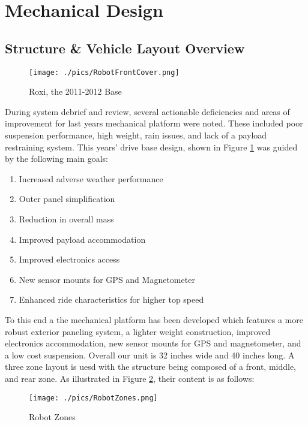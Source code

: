 \section{Mechanical Design}

\subsection{Structure \& Vehicle Layout Overview}

\begin{figure}[H]
\begin{center}
\texttt{[image: ./pics/RobotFrontCover.png]}
\caption{Roxi, the 2011-2012 Base}
\label{FIG:Roxi}
\end{center}
\end{figure}


 During system debrief and review, several actionable deficiencies and areas of improvement for last years mechanical platform were noted. These included poor suspension performance, high weight, rain issues, and lack of a payload restraining system. This years' drive base design, shown in Figure \ref{FIG:Roxi} was guided by the following main goals:

\begin{enumerate}
\item Increased adverse weather performance
\item Outer panel simplification
\item Reduction in overall mass
\item Improved payload accommodation
\item Improved electronics access
\item New sensor mounts for GPS and Magnetometer
\item Enhanced ride characteristics for higher top speed
\end{enumerate}

To this end a the mechanical platform has been developed which features a more robust exterior paneling system, a lighter weight construction, improved electronics accommodation, new sensor mounts for GPS and magnetometer, and a low cost suspension. Overall our unit is 32 inches wide and 40 inches long. A three zone layout is uesd with the structure being composed of a front, middle, and rear zone. As illustrated in Figure \ref{FIG:Zones}, their content is as follows:

\begin{figure}[H]
\begin{center}
\texttt{[image: ./pics/RobotZones.png]}
\caption{Robot Zones}
\label{FIG:Zones}
\end{center}
\end{figure}

